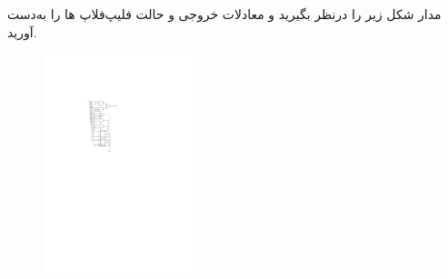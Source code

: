 

مدار شکل زیر را درنظر بگیرید و معادلات خروجی و حالت فلیپ‌فلاپ ها را به‌دست آورید.

\begin{figure}[h]
	\centering
	\includegraphics[width=0.4\textwidth]{fig/Q_basic2.pdf}
	\label{fig:Q_basic_2}
\end{figure}